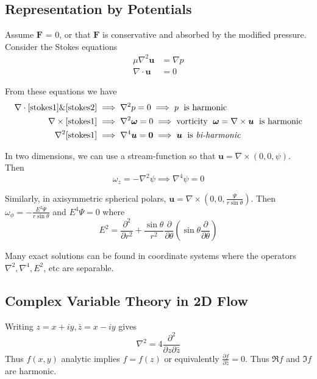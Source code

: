 \documentclass{jknotes}
\begin{document}
\subsection{Representation by Potentials}
Assume $\bm{F}$ = 0, or that $\bm{F}$ is conservative and absorbed by the
modified pressure. Consider the Stokes equations
\begin{align}
	\mu \nabla^2 \bm{u} &= \nabla p \label{stokes1} \\
	\nabla \cdot \bm{u} &= 0 \label{stokes2}
\end{align}

From these equations we have
\begin{equation}
	\begin{aligned}
		\nabla \cdot \eqref{stokes1} \& \eqref{stokes2} &\implies \nabla^2 p = 0 \implies
		p \hspace{.6em} \text{is harmonic} \\
		\nabla \times \eqref{stokes1} &\implies \nabla^2 \bm{\omega} = 0
		\implies \text{vorticity}\hspace{.6em}\bm{\omega} = \nabla \times
		\bm{u} \hspace{.6em} \text{is harmonic} \\
		\nabla^2  \eqref{stokes1} &\implies \nabla^4 \bm{u} = \bm{0} \implies
		\bm{u} \hspace{.6em} \text{is \emph{bi-harmonic}}
	\end{aligned}
\end{equation}

In two dimensions, we can use a stream-function so that $\bm{u} = \nabla
\times (0,0,\psi)$. Then
\begin{equation}
	\omega_z = -\nabla^2 \psi \implies \nabla^4 \psi = 0
\end{equation}

Similarly, in axisymmetric spherical polars, $\bm{u} = \nabla \times
(0,0,\frac{\Psi}{r \sin \theta})$. Then $\omega_\phi = -\frac{E^2 \Psi}{r\sin
\theta}$ and $E^4 \Psi = 0$ where
\begin{equation}
	E^2 = \frac{\partial^2}{\partial r^2} + \frac{\sin \theta}{r^2}
	\frac{\partial}{\partial \theta} \left( \sin \theta
	\frac{\partial}{\partial \theta}\right)
\end{equation}

Many exact solutions can be found in coordinate systems where the operators
$\nabla^2, \nabla^4, E^2$, etc are separable.

\subsection{Complex Variable Theory in 2D Flow}
Writing $z = x+iy, \bar{z} = x-iy$ gives
\begin{equation}
	\nabla^2 = 4 \frac{\partial^2}{\partial z \partial \bar{z}}
\end{equation}
Thus $f(x,y)$ analytic implies $f = f(z)$ or equivalently $\frac{\partial
f}{\partial \bar{z}} = 0$. Thus $\Re f$ and $\Im f$ are harmonic.
\end{document}
